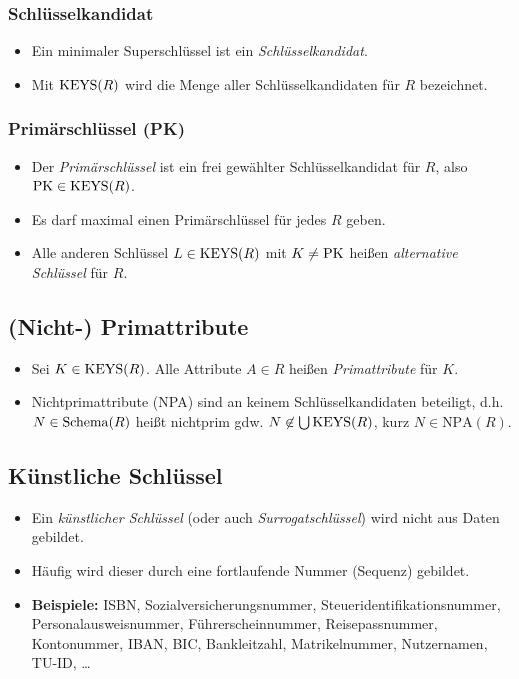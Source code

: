             \subsubsection{Schlüsselkandidat} %
            	\begin{itemize}
            		\item Ein minimaler Superschlüssel ist ein \textit{Schlüsselkandidat}.
            		\item Mit \( \operatorname{KEYS}(R) \) wird die Menge aller Schlüsselkandidaten für \(R\) bezeichnet.
            	\end{itemize}

            \subsubsection{Primärschlüssel (PK)} %
                \begin{itemize}
                	\item Der \textit{Primärschlüssel} ist ein frei gewählter Schlüsselkandidat für \(R\), also \( \operatorname{PK} \in \operatorname{KEYS}(R) \).
                	\item Es darf maximal einen Primärschlüssel für jedes \(R\) geben.
                	\item Alle anderen Schlüssel \( L \in \operatorname{KEYS}(R) \) mit \( K \neq \operatorname{PK} \) heißen \textit{alternative Schlüssel} für \(R\).
                \end{itemize}

        \subsection{(Nicht-) Primattribute} %
            \begin{itemize}
            	\item Sei \( K \in \operatorname{KEYS}(R) \). Alle Attribute \( A \in R \) heißen \textit{Primattribute} für \(K\).
            	\item Nichtprimattribute (NPA) sind an keinem Schlüsselkandidaten beteiligt, d.h. \( N \in \operatorname{Schema}(R) \) heißt nichtprim gdw. \( N \not\in \bigcup \operatorname{KEYS}(R) \), kurz \( N \in \text{NPA}(R) \).
            \end{itemize}

        \subsection{Künstliche Schlüssel} %
            \begin{itemize}
            	\item Ein \textit{künstlicher Schlüssel} (oder auch \textit{Surrogatschlüssel}) wird nicht aus Daten gebildet.
            	\item Häufig wird dieser durch eine fortlaufende Nummer (Sequenz) gebildet.
            	\item \textbf{Beispiele:} ISBN, Sozialversicherungsnummer, Steueridentifikationsnummer, Personalausweisnummer, Führerscheinnummer, Reisepassnummer, Kontonummer, IBAN, BIC, Bankleitzahl, Matrikelnummer, Nutzernamen, TU-ID, \dots
            \end{itemize}

